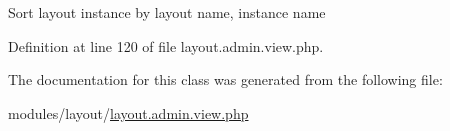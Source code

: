 Sort layout instance by layout name, instance name 

Definition at line 120 of file layout.\+admin.\+view.\+php.



The documentation for this class was generated from the following file\+:\begin{DoxyCompactItemize}
\item 
modules/layout/\hyperlink{layout_8admin_8view_8php}{layout.\+admin.\+view.\+php}\end{DoxyCompactItemize}
